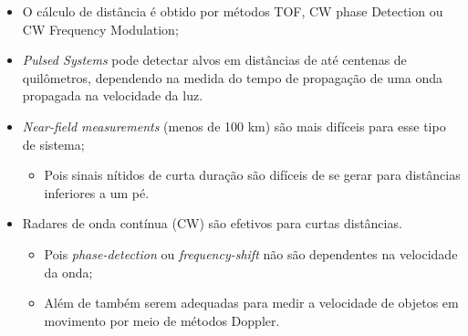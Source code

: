 \documentclass[xcolor=dvipsnames, aspectratio=169]{beamer}
\begin{document}
\begin{frame}
\begin{itemize}
    \newpage
    \item O cálculo de distância é obtido por métodos TOF, CW phase Detection ou CW Frequency Modulation;
    \item \textit{Pulsed Systems} pode detectar alvos em distâncias de até centenas de quilômetros, dependendo na medida do tempo de propagação de uma onda propagada na velocidade da luz.
    \item \textit{Near-field measurements} (menos de 100 km) são mais difíceis para esse tipo de sistema;
    \begin{itemize}
        \item Pois sinais nítidos de curta duração são difíceis de se gerar para distâncias inferiores a um pé.
    \end{itemize} 
    \item Radares de onda contínua (CW) são efetivos para curtas distâncias.
    \begin{itemize}
        \item Pois \textit{phase-detection} ou \textit{frequency-shift} não são dependentes na velocidade da onda;
        \item Além de também serem adequadas para medir a velocidade de objetos em movimento por meio de métodos Doppler.
    \end{itemize}
	\end{itemize}
	
\end{frame}
\end{document}
